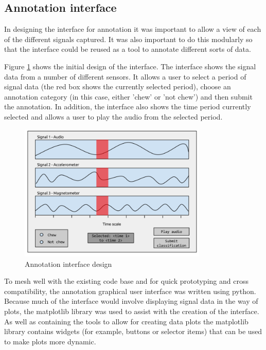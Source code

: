 \subsection{Annotation interface}

In designing the interface for annotation it was important to allow a view of each of the different signals captured. It was also important to do this modularly so that the interface could be reused as a tool to annotate different sorts of data.

Figure \ref{annotation_interface_design} shows the initial design of the interface. The interface shows the signal data from a number of different sensors. It allows a user to select a period of signal data (the red box shows the currently selected period), choose an annotation category (in this case, either 'chew' or 'not chew') and then submit the annotation. In addition, the interface also shows the time period currently selected and allows a user to play the audio from the selected period. 

\begin{figure}[ht!]
\begin{center}
\leavevmode
\includegraphics[width=0.8\textwidth]{images/annotation_interface_design.png}
\end{center}
\caption{Annotation interface design}
\label{annotation_interface_design}
\end{figure}

To mesh well with the existing code base and for quick prototyping and cross compatibility, the annotation graphical user interface was written using python. Because much of the interface would involve displaying signal data in the way of plots, the matplotlib library was used to assist with the creation of the interface. As well as containing the tools to allow for creating data plots the matplotlib library contains widgets (for example, buttons or selector items) that can be used to make plots more dynamic. 

